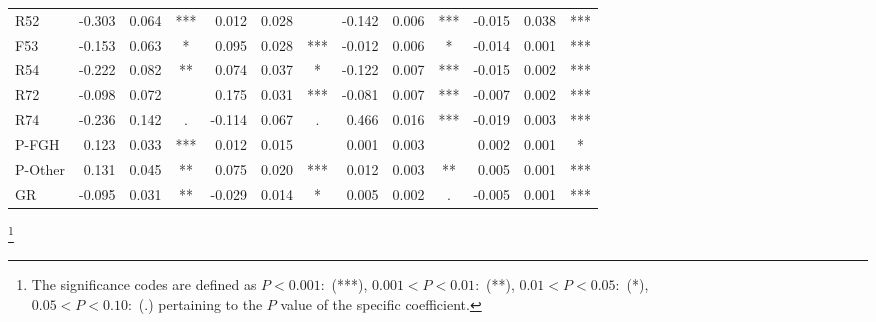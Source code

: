 \documentclass[11pt,letterpaper]{article}
\numberwithin{equation}{section}
\numberwithin{equation}{section}
\numberwithin{equation}{section}
\begin{document}
\begin{center}
\begin{table}
\begin{tabular}{|l|rrc|rrc|rrc|rrc|}
R52       & -0.303 & 0.064 & *** & 0.012   & 0.028 &     & -0.142 & 0.006  & *** & -0.015 & 0.038 & *** \\
F53       & -0.153 & 0.063 & *   & 0.095  & 0.028 & *** & -0.012 & 0.006  & *   & -0.014 & 0.001 & *** \\
R54       & -0.222 & 0.082 & **  & 0.074  & 0.037 & *   & -0.122 & 0.007 & *** & -0.015  & 0.002 & *** \\
R72       & -0.098 & 0.072 &     & 0.175  & 0.031 & *** & -0.081 & 0.007 & *** & -0.007 & 0.002 & *** \\
R74       & -0.236 & 0.142 & .   & -0.114 & 0.067 & .   & 0.466  & 0.016 & *** & -0.019 & 0.003 & *** \\
P-FGH     & 0.123 & 0.033 & *** & 0.012 & 0.015 &     & 0.001    & 0.003 &     & 0.002  & 0.001 & *   \\
P-Other   & 0.131  & 0.045 & **  & 0.075   & 0.020 & *** & 0.012  & 0.003 & **  & 0.005  & 0.001  & *** \\
GR        & -0.095 & 0.031 & **  & -0.029 & 0.014 & *   & 0.005   & 0.002 & .   & -0.005 & 0.001 & *** \\
\hline\hline
\end{tabular}
\footnote{The significance codes are defined as $  P < 0.001 : $  (***), $0.001 < P < 0.01:$ (**), $  0.01 < P < 0.05:$ (*),\\ $0.05 < P < 0.10 : $ (.) %
pertaining to the $P$ value of the specific coefficient.}
\end{table}


\end{center}
\end{document}
